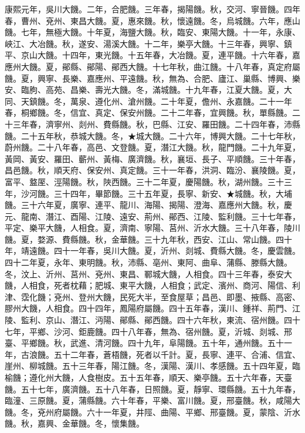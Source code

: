 \begin{pinyinscope}
康熙元年，吳川大饑。二年，合肥饑。三年春，揭陽饑。秋，交河、寧晉饑。四年春，曹州、兗州、東昌大饑。夏，惠來饑。秋，懷遠饑。冬，烏城饑。六年，應山饑。七年，無極大饑。十年夏，海鹽大饑。秋，臨安、東陽大饑。十一年，永康、峽江、大冶饑。秋，遂安、湯溪大饑。十二年，樂亭大饑。十三年春，興寧、鎮平、京山大饑。十四年，東光饑。十五年春，大冶饑。夏，連平饑。十六年春，嘉應州大饑。夏，鄖縣、鄖陽、鄖西大饑。十七年秋，曲江饑。十八年春，真定府屬饑。夏，興寧、長樂、嘉應州、平遠饑。秋，無為、合肥、廬江、巢縣、博興、樂安、臨朐、高苑、昌樂、壽光大饑。冬，滿城饑。十九年春，江夏大饑。夏，大同、天鎮饑。冬，萬泉、遵化州、滄州饑。二十年夏，儋州、永嘉饑。二十一年春，桐鄉饑。冬，信宜、真定、保安州饑。二十二年春，宜興饑。秋，單縣饑。二十三年春，濟寧州、剡州、費縣饑。秋，巴縣、江安、羅田饑。二十四年春，沛縣饑。二十五年秋，恭城大饑。冬，★城大饑。二十六年，博興大饑。二十七年秋，蔚州饑。二十八年春，高邑、文登饑。夏，潛江大饑。秋，龍門饑。二十九年夏，黃岡、黃安、羅田、蘄州、黃梅、廣濟饑。秋，襄垣、長子、平順饑。三十年春，昌邑饑。秋，順天府、保安州、真定饑。三十一年春，洪洞、臨汾、襄陵饑。夏，富平、盩厔、涇陽饑。秋，陜西饑。三十二年夏，慶陽饑。秋，湖州饑。三十三年，沙河饑。三十四年，畢節饑。三十五年夏，長寧、新安、★城饑。秋，大埔饑。三十六年夏，廣寧、連平、龍川、海陽、揭陽、澄海、嘉應州大饑。秋，慶元、龍南、潛江、酉陽、江陵、遠安、荊州、鄖西、江陵、監利饑。三十七年春，平定、樂平大饑，人相食。夏，濟南、寧陽、莒州、沂水大饑。三十八年春，陵川饑。夏，婺源、費縣饑。秋，金華饑。三十九年秋，西安、江山、常山饑。四十年，靖遠饑。四十一年春，吳川大饑。夏，沂州、剡城、費縣大饑。冬，慶雲饑。四十二年夏，永年、東明饑。秋，沛縣、亳州、東阿、曲阜、蒲縣、滕縣大饑。冬，汶上、沂州、莒州、兗州、東昌、鄆城大饑，人相食。四十三年春，泰安大饑，人相食，死者枕藉；肥城、東平大饑，人相食；武定、濱州、商河、陽信、利津、霑化饑；兗州、登州大饑，民死大半，至食屋草；昌邑、即墨、掖縣、高密、膠州大饑，人相食。四十四年，鳳陽府屬饑。四十五年春，漢川、鍾祥、荊門、江陵、監利、京山、潛江、沔陽、鄖縣、鄖西饑。四十六年秋，東流、宿州饑。四十七年，平鄉、沙河、鉅鹿饑。四十八年春，無為、宿州饑。夏，沂城、剡城、邢臺、平鄉饑。秋，武進、清河饑。四十九年，阜陽饑。五十年，通州饑。五十一年，古浪饑。五十二年春，蒼梧饑，死者以千計。夏，長寧、連平、合浦、信宜、崖州、柳城饑。五十三年春，陽江饑。冬，漢陽、漢川、孝感饑。五十四年夏，臨榆饑；遵化州大饑，人食樹皮。五十五年春，順天、樂亭饑。五十六年春，天臺饑。五十七年，廣濟饑。五十八年春，日照饑。夏，靜寧、環縣饑。五十九年春，臨潼、三原饑。夏，蒲縣饑。六十年春，平樂、富川饑。夏，邢臺饑。秋，咸陽大饑。冬，兗州府屬饑。六十一年夏，井陘、曲陽、平鄉、邢臺饑。夏，蒙陰、沂水饑。秋，嘉興、金華饑。冬，懷集饑。


\end{pinyinscope}

